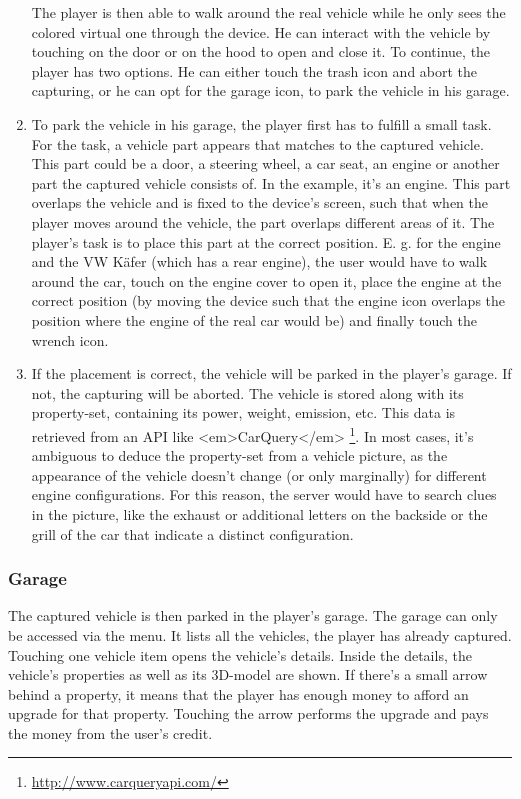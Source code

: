 \begin{enumerate}
The player is then able to walk around the real vehicle while he only sees the colored virtual one through the device. He can interact with the vehicle by touching on the door or on the hood to open and close it. To continue, the player has two options. He can either touch the trash icon and abort the capturing, or he can opt for the garage icon, to park the vehicle in his garage.
  \item To park the vehicle in his garage, the player first has to fulfill a small task. For the task, a vehicle part appears that matches to the captured vehicle. This part could be a door, a steering wheel, a car seat, an engine or another part the captured vehicle consists of. In the example, it’s an engine. This part overlaps the vehicle and is fixed to the device’s screen, such that when the player moves around the vehicle, the part overlaps different areas of it. The player's task is to place this part at the correct position. E. g. for the engine and the VW K\"afer (which has a rear engine), the user would have to walk around the car, touch on the engine cover to open it, place the engine at the correct position (by moving the device such that the engine icon overlaps the position where the engine of the real car would be) and finally touch the wrench icon.
  \item If the placement is correct, the vehicle will be parked in the player's garage. If not, the capturing will be aborted. The vehicle is stored along with its property-set, containing its power, weight, emission, etc. This data is retrieved from an API like <em>CarQuery</em> \footnote{\url{http://www.carqueryapi.com/}}. In most cases, it's ambiguous to deduce the property-set from a vehicle picture, as the appearance of the vehicle doesn’t change (or only marginally) for different engine configurations. For this reason, the server would have to search clues in the picture, like the exhaust or additional letters on the backside or the grill of the car that indicate a distinct configuration.
\end{enumerate}

\subsubsection{Garage}
The captured vehicle is then parked in the player’s garage. The garage can only be accessed via the menu. It lists all the vehicles, the player has already captured. Touching one vehicle item opens the vehicle’s details. Inside the details, the vehicle’s properties as well as its 3D-model are shown. If there’s a small arrow behind a property, it means that the player has enough money to afford an upgrade for that property. Touching the arrow performs the upgrade and pays the money from the user's credit.

